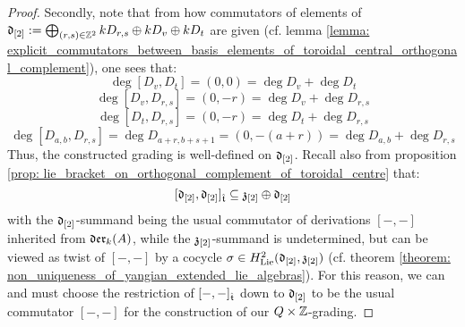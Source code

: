 \begin{proof}
                Secondly, note that from how commutators of elements of $\mathfrak{d}_{[2]} := \bigoplus_{(r, s) \in \mathbb{Z}^2} k D_{r, s} \oplus k D_v \oplus k D_t$ are given (cf. lemma \ref{lemma: explicit_commutators_between_basis_elements_of_toroidal_central_orthogonal_complement}), one sees that:
                    $$\deg [D_v, D_t] = (0, 0) = \deg D_v + \deg D_t$$
                    $$\deg [D_v, D_{r, s}] = (0, -r) = \deg D_v + \deg D_{r, s}$$
                    $$\deg [D_t, D_{r, s}] = (0, -r) = \deg D_t + \deg D_{r, s}$$
                    $$\deg [D_{a, b}, D_{r, s}] = \deg D_{a + r, b + s + 1} = (0, -(a + r)) = \deg D_{a, b} + \deg D_{r, s}$$
                Thus, the constructed grading is well-defined on $\mathfrak{d}_{[2]}$. Recall also from proposition \ref{prop: lie_bracket_on_orthogonal_complement_of_toroidal_centre} that:
                    $$[\mathfrak{d}_{[2]}, \mathfrak{d}_{[2]}]_{\hat{\mathfrak{t}}} \subseteq \mathfrak{z}_{[2]} \oplus \mathfrak{d}_{[2]}$$
                with the $\mathfrak{d}_{[2]}$-summand being the usual commutator of derivations $[-, -]$ inherited from $\mathfrak{der}_{k}(A)$, while the $\mathfrak{z}_{[2]}$-summand is undetermined, but can be viewed as twist of $[-, -]$ by a cocycle $\sigma \in H^2_{\mathrm{Lie}}(\mathfrak{d}_{[2]}, \mathfrak{z}_{[2]})$ (cf. theorem \ref{theorem: non_uniqueness_of_yangian_extended_lie_algebras}). For this reason, we can and must choose the restriction of $[-, -]_{\hat{\mathfrak{t}}}$ down to $\mathfrak{d}_{[2]}$ to be the usual commutator $[-, -]$ for the construction of our $Q \x \Z$-grading. 
            \end{proof}

